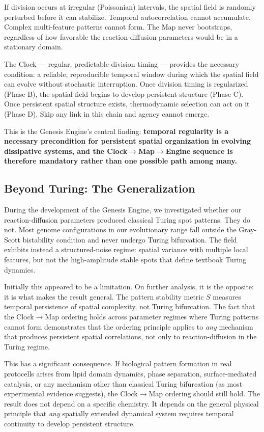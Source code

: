 \documentclass[11pt,letterpaper]{article}
\begin{document}
If division occurs at irregular (Poissonian) intervals, the spatial field is randomly perturbed before it can stabilize. Temporal autocorrelation cannot accumulate. Complex multi-feature patterns cannot form. The Map never bootstraps, regardless of how favorable the reaction-diffusion parameters would be in a stationary domain.

The Clock --- regular, predictable division timing --- provides the necessary condition: a reliable, reproducible temporal window during which the spatial field can evolve without stochastic interruption. Once division timing is regularized (Phase B), the spatial field begins to develop persistent structure (Phase C). Once persistent spatial structure exists, thermodynamic selection can act on it (Phase D). Skip any link in this chain and agency cannot emerge.

This is the Genesis Engine's central finding: \textbf{temporal regularity is a necessary precondition for persistent spatial organization in evolving dissipative systems, and the Clock$\to$Map$\to$Engine sequence is therefore mandatory rather than one possible path among many.}

\subsection{Beyond Turing: The Generalization}
\label{sec:beyond-turing}

During the development of the Genesis Engine, we investigated whether our reaction-diffusion parameters produced classical Turing spot patterns. They do not. Most genome configurations in our evolutionary range fall outside the Gray-Scott bistability condition and never undergo Turing bifurcation. The field exhibits instead a structured-noise regime: spatial variance with multiple local features, but not the high-amplitude stable spots that define textbook Turing dynamics.

Initially this appeared to be a limitation. On further analysis, it is the opposite: it is what makes the result general. The pattern stability metric $S$ measures temporal persistence of spatial complexity, not Turing bifurcation. The fact that the Clock$\to$Map ordering holds across parameter regimes where Turing patterns cannot form demonstrates that the ordering principle applies to \emph{any} mechanism that produces persistent spatial correlations, not only to reaction-diffusion in the Turing regime.

This has a significant consequence. If biological pattern formation in real protocells arises from lipid domain dynamics, phase separation, surface-mediated catalysis, or any mechanism other than classical Turing bifurcation (as most experimental evidence suggests), the Clock$\to$Map ordering should still hold. The result does not depend on a specific chemistry. It depends on the general physical principle that \emph{any} spatially extended dynamical system requires temporal continuity to develop persistent structure.
\end{document}
